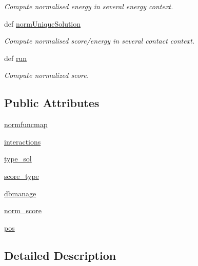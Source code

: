 \begin{DoxyCompactItemize}
\begin{DoxyCompactList}\small\item\em \-Compute normalised energy in several energy context. \end{DoxyCompactList}\item 
def \hyperlink{classirna_1_1iRNA__stat_1_1NormScore_1_1NormScore_ad86b04f0440445b84539345a526dd074}{norm\-Unique\-Solution}
\begin{DoxyCompactList}\small\item\em \-Compute normalised score/energy in several contact context. \end{DoxyCompactList}\item 
def \hyperlink{classirna_1_1iRNA__stat_1_1NormScore_1_1NormScore_a5fe5f5537ddf1f047719fa144dfa89be}{run}
\begin{DoxyCompactList}\small\item\em \-Compute normalized score. \end{DoxyCompactList}\end{DoxyCompactItemize}
\subsection*{\-Public \-Attributes}
\begin{DoxyCompactItemize}
\item 
\hyperlink{classirna_1_1iRNA__stat_1_1NormScore_1_1NormScore_ac5906ce052e29954c451f8994e123751}{normfuncmap}
\item 
\hyperlink{classirna_1_1iRNA__stat_1_1NormScore_1_1NormScore_a1c61805c5e00cd686a9a20f646326d7c}{interactions}
\item 
\hyperlink{classirna_1_1iRNA__stat_1_1NormScore_1_1NormScore_ac8f2146fde80e80b1b11fc09fdcc33ab}{type\-\_\-sol}
\item 
\hyperlink{classirna_1_1iRNA__stat_1_1NormScore_1_1NormScore_a5e7f40cd5290fb29ac3def7e149a3e66}{score\-\_\-type}
\item 
\hyperlink{classirna_1_1iRNA__stat_1_1NormScore_1_1NormScore_a941305e4add4b8665b26ee9366a81248}{dbmanage}
\item 
\hyperlink{classirna_1_1iRNA__stat_1_1NormScore_1_1NormScore_a2e2907cbb46d433d7c3e0b1189360484}{norm\-\_\-score}
\item 
\hyperlink{classirna_1_1iRNA__stat_1_1NormScore_1_1NormScore_a4af9ebe0897d27c268ea20c3c11481e6}{pos}
\end{DoxyCompactItemize}


\subsection{\-Detailed \-Description}


